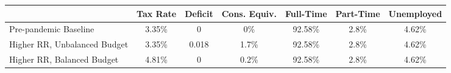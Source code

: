 \begin{center}
\begin{adjustbox}{width=\textwidth}
\begin{tabular}{lcccccc}\toprule
 & Tax Rate & Deficit & Cons. Equiv. & Full-Time & Part-Time & Unemployed \\
\midrule
Pre-pandemic Baseline & 3.35\% & 0 & 0\% & 92.58\% & 2.8\% & 4.62\% \\
Higher RR, Unbalanced Budget & 3.35\% & 0.018 & 1.7\% & 92.58\% & 2.8\% & 4.62\% \\
Higher RR, Balanced Budget & 4.81\% & 0 & 0.2\% & 92.58\% & 2.8\% & 4.62\% \\
\bottomrule\end{tabular}
\end{adjustbox}
\end{center}
